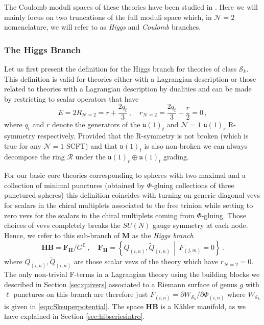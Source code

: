 \documentclass[main.tex]{subfiles}
\begin{document}
The Coulomb moduli spaces of these theories have been studied in \cite{Coman:2015bqq,Razamat:2018zus}. Here we will mainly focus on two truncations of the full moduli space which, in $\mathcal{N}=2$ nomenclature, we will refer to as \textit{Higgs} and \textit{Coulomb} branches. 

\subsubsection{The Higgs Branch}\label{sec:hcbc}
Let us first present the definition for the Higgs branch for theories of class $\mathcal{S}_k$. This definition is valid for theories either with a Lagrangian description or those related to theories with a Lagrangian description by dualities and can be made by restricting to scalar operators that have
\begin{equation}\label{eqn:hbdefcharges}
 E=2R_{\mathcal{N}=2}=r+\frac{2q_t}{3}\,,\quad r_{\mathcal{N}=2}=\frac{2q_t}{3}-\frac{r}{2}=0\, ,
 \end{equation}
  where $q_t$ and $r$ denote the generators of the $\mathfrak{u}(1)_t$ and $\mathcal{N}=1$ $\mathfrak{u}(1)_{r}$ R-symmetry respectively. Provided that the R-symmetry is not broken (which is true for any $\mathcal{N}=1$ SCFT) and that $\mathfrak{u}(1)_t$ is also non-broken we can always decompose the ring $\mathcal{R}$ under the $\mathfrak{u}(1)_{r}\oplus \mathfrak{u}(1)_{t}$ grading. 

For our basic core theories corresponding to spheres with two maximal and a collection of minimal punctures (obtained by $\Phi$-gluing collections of three punctured spheres) this definition coincides with turning on generic diagonal vevs for scalars in the chiral multiplets associated to the free trinion while setting to zero vevs for the scalars in the chiral multiplets coming from $\Phi$-gluing. Those choices of vevs completely breaks the $SU(N)$ gauge symmetry at each node. Hence, we refer to this sub-branch of
$\mathbf{M}$ as the \textit{Higgs branch}
\begin{equation}\label{eqn:HB}
\mathbf{HB}=\mathbf{F_H}/G^{\mathbb{C}}\,,\quad \mathbf{F_H}=\left\{Q_{(i,n)},\widetilde{Q}_{(i,n)}\,\middle|\,F_{(j,m)}=0\right\}\,.
\end{equation}
where $Q_{(i,n)},\widetilde{Q}_{(i,n)}$ are those scalar vevs of the theory which have $r_{\mathcal{N}=2}=0$. The only non-trivial F-terms in a Lagrangian theory using the building blocks we described in Section \ref{sec:quivers} associated to a Riemann surface of genus $g$ with $\ell$ punctures on this branch are therefore just $F_{(i,n)}=\partial W_{\mathcal{S}_k}/\partial{\Phi_{(i,n)}}$ where $W_{\mathcal{S}_k}$ is given in \eqref{eqn:Sksuperpotential}.
The space $\mathbf{HB}$ is a K\"ahler manifold, as we have explained in Section \ref{sec:hibseriesintro}.
\end{document}
